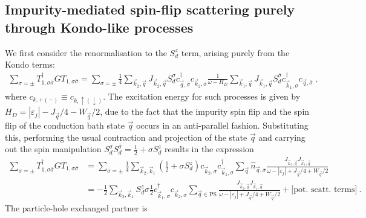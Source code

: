 \documentclass{revtex4-2}
\begin{document}
\subsection{Impurity-mediated spin-flip scattering purely through Kondo-like processes}
We first consider the renormalisation to the \(S_d^z\) term, arising purely from the Kondo terms:
\begin{equation}\begin{aligned}
	\sum_{\sigma=\pm}T_{1,\sigma\bar\sigma}^\dagger G T_{1,\sigma\bar\sigma} = \sum_{\sigma=\pm}\frac{1}{4}\sum_{\vec k_2,\vec q}J_{\vec k_2,\vec q} S_d^\sigma c^\dagger_{\vec q,\bar\sigma} c_{\vec k_2,\sigma} \frac{1}{\omega - H_D}\sum_{\vec k_1,\vec q}J_{\vec k_1,\vec q} S_d^{\bar\sigma} c^\dagger_{\vec k_1,\sigma} c_{\vec q,\bar\sigma}~,
\end{aligned}\end{equation}
where \(c_{k,+(-)} \equiv c_{k,\uparrow(\downarrow)}\). The excitation energy for such processes is given by \(H_D = |\varepsilon_j| - J_{\vec q}/4 - W_{\vec q}/2\), due to the fact that the impurity spin flip and the spin flip of the conduction bath state \(\vec q\) occurs in an anti-parallel fashion. Substituting this, performing the usual contraction and projection of the state \(\vec q\) and carrying out the spin manipulation \(S_d^\sigma S_d^{\bar\sigma} = \frac{1}{2} + \sigma S_d^z\) results in the expression
\begin{equation}\begin{aligned}\label{t1t1p}
	\sum_{\sigma=\pm}T_{1,\sigma\bar\sigma}^\dagger G T_{1,\sigma\bar\sigma} &= \sum_{\sigma=\pm}\frac{1}{4}\sum_{\vec k_2,\vec k_1} \left(\frac{1}{2} + \sigma S_d^z\right) c_{\vec k_2,\sigma} c^\dagger_{\vec k_1,\sigma}\sum_{\vec q}  \hat n_{\vec q,\bar\sigma} \frac{J_{\vec k_2,\vec q} J_{\vec k_1,\vec q}}{\omega - |\varepsilon_j| + J_{\vec q}/4 + W_{\vec q}/2}\\
										 &= -\frac{1}{2}\sum_{\vec k_2,\vec k_1} S_d^z \sigma \frac{1}{2}c^\dagger_{\vec k_1,\sigma}c_{\vec k_2,\sigma} \sum_{\vec q \in \text{PS}} \frac{J_{\vec k_2,\vec q} J_{\vec k_1,\vec q}}{\omega - |\varepsilon_j| + J_{\vec q}/4 + W_{\vec q}/2} + \bigg[\text{pot. scatt. terms}\bigg]~.
\end{aligned}\end{equation}
The particle-hole exchanged partner is
\end{document}
